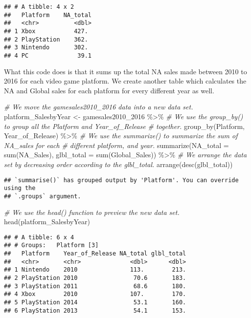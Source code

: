 \documentclass[
]{article}
\newenvironment{Shaded}{\begin{snugshade}}{\end{snugshade}}
\newcommand{\AttributeTok}[1]{\textcolor[rgb]{0.77,0.63,0.00}{#1}}
\newcommand{\CommentTok}[1]{\textcolor[rgb]{0.56,0.35,0.01}{\textit{#1}}}
\newcommand{\FunctionTok}[1]{\textcolor[rgb]{0.00,0.00,0.00}{#1}}
\newcommand{\NormalTok}[1]{#1}
\newcommand{\OtherTok}[1]{\textcolor[rgb]{0.56,0.35,0.01}{#1}}
\newcommand{\SpecialCharTok}[1]{\textcolor[rgb]{0.00,0.00,0.00}{#1}}
\begin{document}
\begin{verbatim}
## # A tibble: 4 x 2
##   Platform    NA_total
##   <chr>          <dbl>
## 1 Xbox           427. 
## 2 PlayStation    362. 
## 3 Nintendo       302. 
## 4 PC              39.1
\end{verbatim}

What this code does is that it sums up the total NA sales made between
2010 to 2016 for each video game platform. We create another table which
calculates the NA and Global sales for each platform for every different
year as well.

\begin{Shaded}
\begin{Highlighting}[]
\CommentTok{\# We move the gamesales2010\_2016 data into a new data set.}
\NormalTok{platform\_SalesbyYear }\OtherTok{\textless{}{-}}\NormalTok{ gamesales2010\_2016 }\SpecialCharTok{\%\textgreater{}\%}
    \CommentTok{\# We use the group\_by() to group all the Platform and Year\_of\_Release}
    \CommentTok{\# together.}
\FunctionTok{group\_by}\NormalTok{(Platform, Year\_of\_Release) }\SpecialCharTok{\%\textgreater{}\%}
    \CommentTok{\# We use the summarize() to summarize the sum of NA\_sales for each}
    \CommentTok{\# different platform, and year.}
\FunctionTok{summarize}\NormalTok{(}\AttributeTok{NA\_total =} \FunctionTok{sum}\NormalTok{(NA\_Sales), }\AttributeTok{glbl\_total =} \FunctionTok{sum}\NormalTok{(Global\_Sales)) }\SpecialCharTok{\%\textgreater{}\%}
    \CommentTok{\# We arrange the data set by decreasing order according to the glbl\_total.}
\FunctionTok{arrange}\NormalTok{(}\FunctionTok{desc}\NormalTok{(glbl\_total))}
\end{Highlighting}
\end{Shaded}

\begin{verbatim}
## `summarise()` has grouped output by 'Platform'. You can override using the
## `.groups` argument.
\end{verbatim}

\begin{Shaded}
\begin{Highlighting}[]
\CommentTok{\# We use the head() function to preview the new data set.}
\FunctionTok{head}\NormalTok{(platform\_SalesbyYear)}
\end{Highlighting}
\end{Shaded}

\begin{verbatim}
## # A tibble: 6 x 4
## # Groups:   Platform [3]
##   Platform    Year_of_Release NA_total glbl_total
##   <chr>       <chr>              <dbl>      <dbl>
## 1 Nintendo    2010               113.        213.
## 2 PlayStation 2010                70.6       183.
## 3 PlayStation 2011                68.6       180.
## 4 Xbox        2010               107.        170.
## 5 PlayStation 2014                53.1       160.
## 6 PlayStation 2013                54.1       153.
\end{verbatim}
\end{document}
